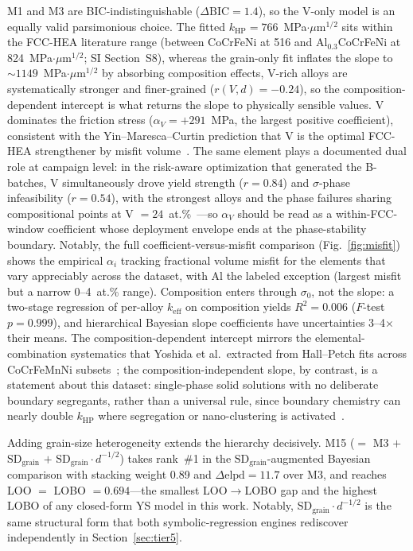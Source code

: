 \documentclass[5p,times,twocolumn]{elsarticle}
\begin{document}
M1 and M3 are BIC-indistinguishable ($\Delta\text{BIC} = 1.4$), so the V-only model is an equally valid parsimonious choice. The fitted $k_\text{HP} = 766$~MPa$\cdot\mu$m$^{1/2}$ sits within the FCC-HEA literature range (between CoCrFeNi at 516 and Al$_{0.3}$CoCrFeNi at 824~MPa$\cdot\mu$m$^{1/2}$; SI Section~S8), whereas the grain-only fit inflates the slope to ${\sim}1149$~MPa$\cdot\mu$m$^{1/2}$ by absorbing composition effects, V-rich alloys are systematically stronger and finer-grained ($r(V, d) = -0.24$), so the composition-dependent intercept is what returns the slope to physically sensible values. V dominates the friction stress ($\alpha_V = +291$~\si{MPa}, the largest positive coefficient), consistent with the Yin--Maresca--Curtin prediction that V is the optimal FCC-HEA strengthener by misfit volume~\cite{Yin2020}. The same element plays a documented dual role at campaign level: in the risk-aware optimization that generated the B-batches, V simultaneously drove yield strength ($r = 0.84$) and $\sigma$-phase infeasibility ($r = 0.54$), with the strongest alloys and the phase failures sharing compositional points at V $= 24$~at.\%~\cite{Mulukutla2026BRAVE}---so $\alpha_V$ should be read as a within-FCC-window coefficient whose deployment envelope ends at the phase-stability boundary. Notably, the full coefficient-versus-misfit comparison (Fig.~\ref{fig:misfit}) shows the empirical $\alpha_i$ tracking fractional volume misfit for the elements that vary appreciably across the dataset, with Al the labeled exception (largest misfit but a narrow 0--4~at.\% range). Composition enters through $\sigma_0$, not the slope: a two-stage regression of per-alloy $k_\text{eff}$ on composition yields $R^2 = 0.006$ ($F$-test $p = 0.999$), and hierarchical Bayesian slope coefficients have uncertainties 3--4$\times$ their means. The composition-dependent intercept mirrors the elemental-combination systematics that Yoshida et al.\ extracted from Hall--Petch fits across CoCrFeMnNi subsets~\cite{Yoshida2019acta}; the composition-independent slope, by contrast, is a statement about this dataset: single-phase solid solutions with no deliberate boundary segregants, rather than a universal rule, since boundary chemistry can nearly double $k_\text{HP}$ where segregation or nano-clustering is activated~\cite{LiKHP2024}.

Adding grain-size heterogeneity extends the hierarchy decisively. M15 ($=$ M3 $+$ $\text{SD}_\text{grain}$ $+$ $\text{SD}_\text{grain}\cdot d^{-1/2}$) takes rank~\#1 in the $\text{SD}_\text{grain}$-augmented Bayesian comparison with stacking weight 0.89 and $\Delta\text{elpd} = 11.7$ over M3, and reaches LOO $= $ LOBO $= 0.694$---the smallest LOO$\to$LOBO gap and the highest LOBO of any closed-form YS model in this work. Notably, $\text{SD}_\text{grain}\cdot d^{-1/2}$ is the same structural form that both symbolic-regression engines rediscover independently in Section~\ref{sec:tier5}.
\end{document}
